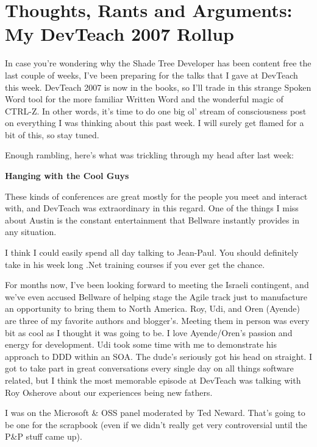 \documentclass{article}
\begin{document}
\section[ How I got into this mess ]{ Thoughts, Rants and Arguments: My DevTeach 2007 Rollup } 




In case you're wondering why the Shade Tree Developer has been content free the last couple of weeks, I've been preparing for the talks that I gave at DevTeach this week.  DevTeach 2007 is now in the books, so I'll trade in this strange Spoken Word tool for the more familiar Written Word and the wonderful magic of CTRL-Z.  In other words, it's time to do one big ol' stream of consciousness post on everything I was thinking about this past week.  I will surely get flamed for a bit of this, so stay tuned.

Enough rambling, here's what was trickling through my head after last week:

 
\Large {\textbf {Hanging with the Cool Guys}}

These kinds of conferences are great mostly for the people you meet and interact with, and DevTeach was extraordinary in this regard.  One of the things I miss about Austin is the constant entertainment that Bellware instantly provides in any situation. 

I think I could easily spend all day talking to Jean-Paul.  You should definitely take in his week long .Net training courses if you ever get the chance. 

For months now, I've been looking forward to meeting the Israeli contingent, and we've even accused Bellware of helping stage the Agile track just to manufacture an opportunity to bring them to North America.  Roy, Udi, and Oren (Ayende) are three of my favorite authors and blogger's.  Meeting them in person was every bit as cool as I thought it was going to be.  I love Ayende/Oren's passion and energy for development.  Udi took some time with me to demonstrate his approach to DDD within an SOA.  The dude's seriously got his head on straight.  I got to take part in great conversations every single day on all things software related, but I think the most memorable episode at DevTeach was talking with Roy Osherove about our experiences being new fathers.

I was on the Microsoft \& OSS panel moderated by Ted Neward.  That's going to be one for the scrapbook (even if we didn't really get very controversial until the P\&P stuff came up).
\end{document}
